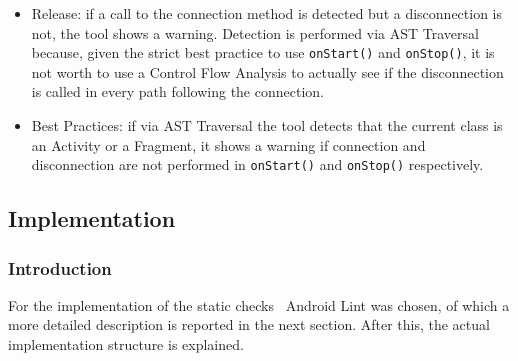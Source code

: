 \documentclass[11pt,a4paper,notitlepage]{article}
\begin{document}
\begin{itemize}
\begin{itemize}
		\item Release: if a call to the connection method is detected but a disconnection is not, the tool shows a warning. Detection is performed via AST Traversal because, given the strict best practice to use \texttt{onStart()} and \texttt{onStop()}, it is not worth to use a Control Flow Analysis to actually see if the disconnection is called in every path following the connection.
		\item Best Practices: if via AST Traversal the tool detects that the current class is an Activity or a Fragment, it shows a warning if connection and disconnection are not performed in \texttt{onStart()} and \texttt{onStop()} respectively.
	\end{itemize}
\end{itemize}

\subsection{Implementation}

\subsubsection{Introduction}
For the implementation of the static checks~\cite{RepositoryStatic} Android Lint was chosen, of which a more detailed description is reported in the next section. After this, the actual implementation structure is explained.
\end{document}
